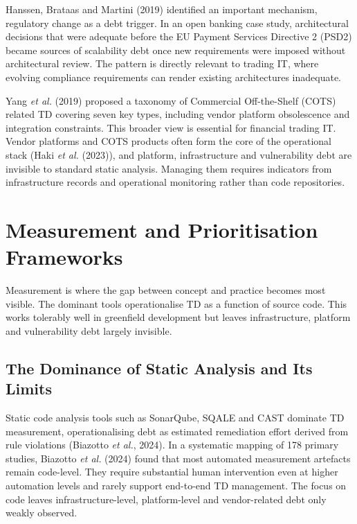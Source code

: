 \documentclass[
  12pt,
  letterpaper,
  12pt,
  oneside,
  english,
  onehalfspacing,
  headsepline]{MastersDoctoralThesis}
\begin{document}
Hanssen, Brataas and Martini (2019) identified an important mechanism,
regulatory change as a debt trigger. In an open banking case study,
architectural decisions that were adequate before the EU Payment
Services Directive 2 (PSD2) became sources of scalability debt once new
requirements were imposed without architectural review. The pattern is
directly relevant to trading IT, where evolving compliance requirements
can render existing architectures inadequate.

Yang \emph{et al.} (2019) proposed a taxonomy of Commercial
Off-the-Shelf (COTS) related TD covering seven key types, including
vendor platform obsolescence and integration constraints. This broader
view is essential for financial trading IT. Vendor platforms and COTS
products often form the core of the operational stack (Haki \emph{et
al.} (2023)), and platform, infrastructure and vulnerability debt are
invisible to standard static analysis. Managing them requires indicators
from infrastructure records and operational monitoring rather than code
repositories.

\section{Measurement and Prioritisation
Frameworks}\label{measurement-and-prioritisation-frameworks}

Measurement is where the gap between concept and practice becomes most
visible. The dominant tools operationalise TD as a function of source
code. This works tolerably well in greenfield development but leaves
infrastructure, platform and vulnerability debt largely invisible.

\subsection{The Dominance of Static Analysis and Its
Limits}\label{the-dominance-of-static-analysis-and-its-limits}

Static code analysis tools such as SonarQube, SQALE and CAST dominate TD
measurement, operationalising debt as estimated remediation effort
derived from rule violations (Biazotto \emph{et al.}, 2024). In a
systematic mapping of 178 primary studies, Biazotto \emph{et al.} (2024)
found that most automated measurement artefacts remain code-level. They
require substantial human intervention even at higher automation levels
and rarely support end-to-end TD management. The focus on code leaves
infrastructure-level, platform-level and vendor-related debt only weakly
observed.
\end{document}
